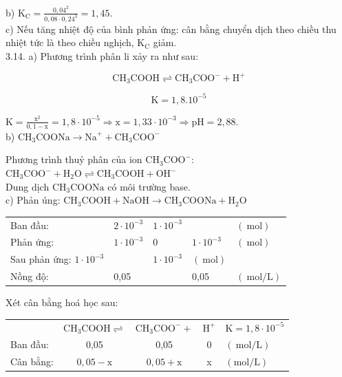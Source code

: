 \documentclass[10pt]{article}
\begin{document}
b) $\mathrm{K}_{\mathrm{C}}=\frac{0,04^{2}}{0,08 \cdot 0,24^{3}}=1,45$.\\
c) Nếu tăng nhiệt độ của bình phản ứng: cân bằng chuyển dịch theo chiều thu nhiệt tức là theo chiều nghịch, $\mathrm{K}_{\mathrm{C}}$ giảm.\\
3.14. a) Phương trình phân li xảy ra như sau:

$$
\mathrm{CH}_{3} \mathrm{COOH} \rightleftharpoons \mathrm{CH}_{3} \mathrm{COO}^{-}+\mathrm{H}^{+}
$$

$$
\mathrm{K}=1,8.10^{-5}
$$

$\mathrm{K}=\frac{\mathrm{x}^{2}}{0,1-\mathrm{x}}=1,8 \cdot 10^{-5} \Rightarrow \mathrm{x}=1,33 \cdot 10^{-3} \Rightarrow \mathrm{pH}=2,88$.\\
b) $\mathrm{CH}_{3} \mathrm{COONa} \longrightarrow \mathrm{Na}^{+}+\mathrm{CH}_{3} \mathrm{COO}^{-}$

Phương trình thuỷ phân của ion $\mathrm{CH}_{3} \mathrm{COO}^{-}$:\\
$\mathrm{CH}_{3} \mathrm{COO}^{-}+\mathrm{H}_{2} \mathrm{O} \rightleftharpoons \mathrm{CH}_{3} \mathrm{COOH}+\mathrm{OH}^{-}$\\
Dung dịch $\mathrm{CH}_{3} \mathrm{COONa}$ có môi trường base.\\
c) Phản úng: $\mathrm{CH}_{3} \mathrm{COOH}+\mathrm{NaOH} \longrightarrow \mathrm{CH}_{3} \mathrm{COONa}+\mathrm{H}_{2} \mathrm{O}$

\begin{center}
\begin{tabular}{lllll}
Ban đầu: & $2 \cdot 10^{-3}$ & $1 \cdot 10^{-3}$ &  & $(\mathrm{~mol})$ \\
Phản ứng: & $1 \cdot 10^{-3}$ & 0 & $1 \cdot 10^{-3}$ & $(\mathrm{~mol})$ \\
Sau phản ứng: $1 \cdot 10^{-3}$ &  & $1 \cdot 10^{-3}$ & $(\mathrm{~mol})$ &  \\
Nồng độ: & 0,05 &  & 0,05 & $(\mathrm{~mol} / \mathrm{L})$ \\
\end{tabular}
\end{center}

Xét cân bằng hoá học sau:

\begin{center}
\begin{tabular}{lcccl}
 & $\mathrm{CH}_{3} \mathrm{COOH} \rightleftharpoons$ & $\mathrm{CH}_{3} \mathrm{COO}^{-}+$ & $\mathrm{H}^{+}$ & $\mathrm{K}=1,8 \cdot 10^{-5}$ \\
Ban đầu: & 0,05 & 0,05 & 0 & $(\mathrm{~mol} / \mathrm{L})$ \\
Cân bằng: & $0,05-\mathrm{x}$ & $0,05+\mathrm{x}$ & x & $(\mathrm{mol} / \mathrm{L})$ \\
\end{tabular}
\end{center}
\end{document}
